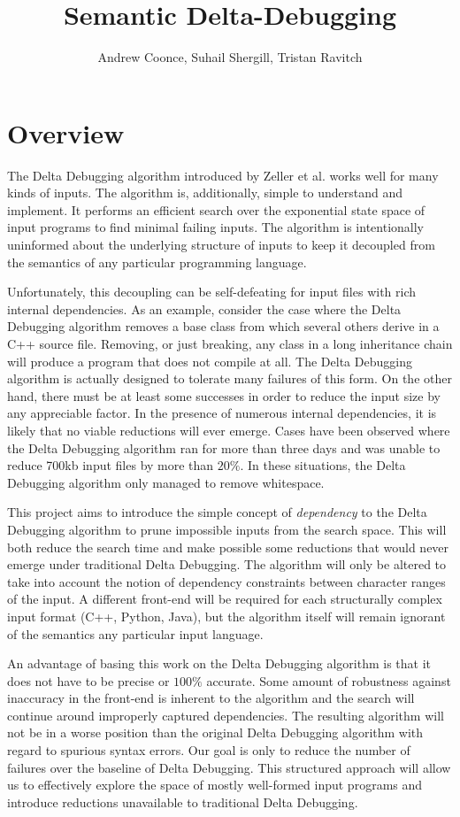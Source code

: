 \documentclass[11pt]{article}
\title{Semantic Delta-Debugging}
\author{
Andrew Coonce, Suhail Shergill, Tristan Ravitch\\
\email{\{coonce, shergill, travitch\}@cs.wisc.edu}
}
\begin{document}
\maketitle

\section{Overview}
The Delta Debugging algorithm introduced by Zeller et al. \cite{dd} works well
for many kinds of inputs. The algorithm is, additionally, simple to understand
and implement. It performs an efficient search over the exponential state space
of input programs to find minimal failing inputs. The algorithm is intentionally
uninformed about the underlying structure of inputs to keep it decoupled from
the semantics of any particular programming language.

Unfortunately, this decoupling can be self-defeating for input files with
rich internal dependencies. As an example, consider the case where the Delta
Debugging algorithm removes a base class from which several others derive in a
C++ source file. Removing, or just breaking, any class in a long inheritance
chain will produce a program that does not compile at all. The Delta Debugging
algorithm is actually designed to tolerate many failures of this form. On the
other hand, there must be at least some successes in order to reduce the input
size by any appreciable factor. In the presence of numerous internal
dependencies, it is likely that no viable reductions will ever emerge. Cases
have been observed where the Delta Debugging algorithm ran for more than three
days and was unable to reduce 700kb input files by more than $20 \%$. In these
situations, the Delta Debugging algorithm only managed to remove whitespace.

This project aims to introduce the simple concept of \emph{dependency} to the
Delta Debugging algorithm to prune impossible inputs from the search space.
This will both reduce the search time and make possible some reductions
that would never emerge under traditional Delta Debugging. The algorithm will
only be altered to take into account the notion of dependency constraints
between character ranges of the input. A different front-end will be required for each
structurally complex input format (C++, Python, Java), but the algorithm itself
will remain ignorant of the semantics any particular input language.

An advantage of basing this work on the Delta Debugging algorithm is that it
does not have to be precise or $100 \%$ accurate. Some amount of robustness
against inaccuracy in the front-end is inherent to the algorithm and the search
will continue around improperly captured dependencies.  The resulting algorithm
will not be in a worse position than the original Delta Debugging algorithm with
regard to spurious syntax errors.  Our goal is only to reduce the number of 
failures over the baseline of Delta Debugging. This structured approach will 
allow us to effectively explore the space of mostly well-formed input programs 
and introduce reductions unavailable to traditional Delta Debugging.
\end{document}
